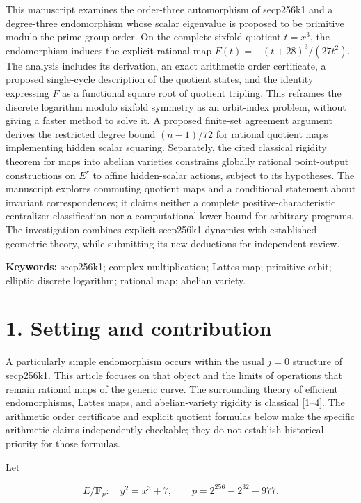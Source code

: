 \documentclass[
  11pt,
  a4paper,
]{article}
\begin{document}
This manuscript examines the order-three automorphism of secp256k1 and a
degree-three endomorphism whose scalar eigenvalue is proposed to be
primitive modulo the prime group order. On the complete sixfold quotient
\(t=x^3\), the endomorphism induces the explicit rational map
\(F(t)=-(t+28)^3/(27t^2)\). The analysis includes its derivation, an
exact arithmetic order certificate, a proposed single-cycle description
of the quotient states, and the identity expressing \(F\) as a
functional square root of quotient tripling. This reframes the discrete
logarithm modulo sixfold symmetry as an orbit-index problem, without
giving a faster method to solve it. A proposed finite-set agreement
argument derives the restricted degree bound \((n-1)/72\) for rational
quotient maps implementing hidden scalar squaring. Separately, the cited
classical rigidity theorem for maps into abelian varieties constrains
globally rational point-output constructions on \(E^r\) to affine
hidden-scalar actions, subject to its hypotheses. The manuscript
explores commuting quotient maps and a conditional statement about
invariant correspondences; it claims neither a complete
positive-characteristic centralizer classification nor a computational
lower bound for arbitrary programs. The investigation combines explicit
secp256k1 dynamics with established geometric theory, while submitting
its new deductions for independent review.

\textbf{Keywords:} secp256k1; complex multiplication; Lattes map;
primitive orbit; elliptic discrete logarithm; rational map; abelian
variety.

\section{1. Setting and contribution}\label{setting-and-contribution}

A particularly simple endomorphism occurs within the usual \(j=0\)
structure of secp256k1. This article focuses on that object and the
limits of operations that remain rational maps of the generic curve. The
surrounding theory of efficient endomorphisms, Lattes maps, and
abelian-variety rigidity is classical {[}1--4{]}. The arithmetic order
certificate and explicit quotient formulas below make the specific
arithmetic claims independently checkable; they do not establish
historical priority for those formulas.

Let

\[
E/\mathbf F_p:\quad y^2=x^3+7,\qquad p=2^{256}-2^{32}-977.
\]
\end{document}

